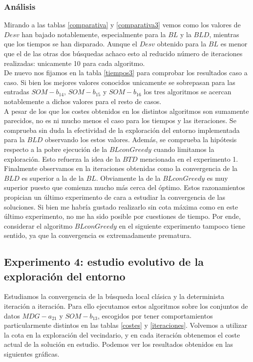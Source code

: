 \documentclass[11pt,a4paper]{article}
\begin{document}
	\subsubsection{ Análisis }
	
	Mirando a las tablas \ref{comparativa} y \ref{comparativa3} vemos como los valores de $Desv$ han bajado notablemente, especialmente para la $BL$ y la $BLD$, mientras que los tiempos se han disparado. Aunque el $Desv$ obtenido para la $BL$ es menor que el de las otras dos búsquedas achaco esto al reducido número de iteraciones realizadas: unicamente 10 para cada algoritmo.  \\ 
	
	De nuevo nos fijamos en la tabla \ref{tiempos3} para comprobar los resultados caso a caso. Si bien los mejores valores conocidos unicamente se sobrepasan para las entradas $SOM-b_14$, $SOM-b_15$ y $SOM-b_16$ los tres algoritmos se acercan notablemente a dichos valores para el resto de casos. \\
	
	A pesar de los que los costes obtenidos en los distintos algoritmos son sumamente parecidos, no es ni mucho menos el caso para los tiempos y las iteraciones. Se comprueba sin duda la efectividad de la exploración del entorno implementada para la $BLD$ observando los estos valores. Además, se comprueba la hipótesis respecto a la pobre ejecución de la $BL con Greedy$ cuando limitamos la exploración. Esto refuerza la idea de la $BTD$ mencionada en el experimento 1. \\
	
	Finalmente observamos en la iteraciones obtenidas como la convergencia de la $BLD$ es superior a la de la $BL$. Obviamente la de la $BL con Greedy$ es muy superior puesto que comienza mucho más cerca del óptimo. Estos razonamientos propician un último experimento de cara a estudiar la convergencia de las soluciones. Si bien me habría gustado realizarlo sin cota máxima como en este último experimento, no me ha sido posible por cuestiones de tiempo. Por ende, considerar el algoritmo $BL con Greedy$ en el siguiente experimento tampoco tiene sentido, ya que la convergencia es extremadamente prematura. 	
		
	\subsection{ Experimento 4: estudio evolutivo de la exploración del entorno }
	
	Estudiamos la convergencia de la búsqueda local clásica y la determinista iteración a iteración. Para ello ejecutamos estos algoritmos sobre los conjuntos de datos $MDG-a_21$ y $SOM-b_13$, escogidos por tener comportamientos particularmente distintos en las tablas \ref{costes} y \ref{iteraciones}. Volvemos a utilizar la cota en la exploración del vecindario, y en cada iteración obtenemos el coste actual de la solución en estudio. Podemos ver los resultados obtenidos en las siguientes gráficas.
	
\end{document}
